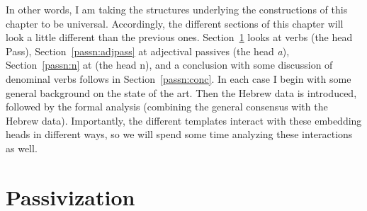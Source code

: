 In other words, I am taking the structures underlying the constructions of this chapter to be universal. Accordingly, the different sections of this chapter will look a little different than the previous ones. Section~\ref{passn:pass} looks at  verbs (the head Pass), Section~\ref{passn:adjpass} at adjectival passives (the head \emph{a}), Section~\ref{passn:n} at  (the head n), and a conclusion with some discussion of denominal verbs follows in Section~\ref{passn:conc}. In each case I begin with some general background on the state of the art. Then the Hebrew data is introduced, followed by the formal analysis (combining the general consensus with the Hebrew data). Importantly, the different templates interact with these embedding heads in different ways, so we will spend some time analyzing these interactions as well.


\section{Passivization} \label{passn:pass}
